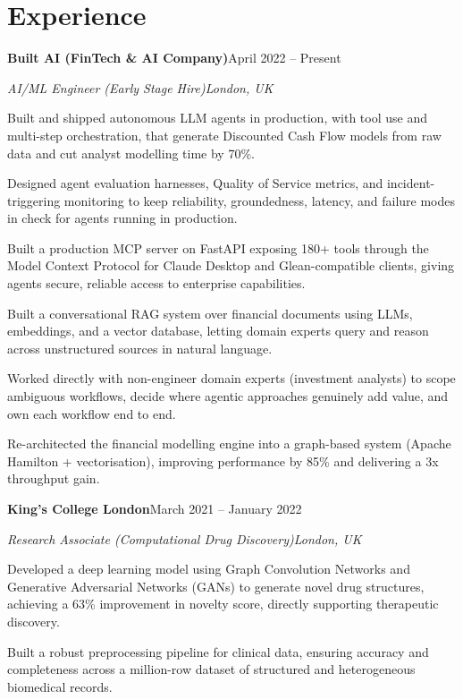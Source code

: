 \documentclass[10pt,a4paper]{article}
\newcommand{\entry}[4]{%
  {\color{company}\bfseries #1}\hfill {\color{muted}#2}\par
  \vspace{1pt}
  {\itshape #3}\hfill {\color{muted}\itshape #4}\par
  \vspace{3pt}%
}
\begin{document}
\section{Experience}
\entry{Built AI (FinTech \& AI Company)}{April 2022 -- Present}{AI/ML Engineer (Early Stage Hire)}{London, UK}
\begin{tight}
  \item Built and shipped autonomous LLM agents in production, with tool use and multi-step orchestration, that generate Discounted Cash Flow models from raw data and cut analyst modelling time by 70\%.
  \item Designed agent evaluation harnesses, Quality of Service metrics, and incident-triggering monitoring to keep reliability, groundedness, latency, and failure modes in check for agents running in production.
  \item Built a production MCP server on FastAPI exposing 180+ tools through the Model Context Protocol for Claude Desktop and Glean-compatible clients, giving agents secure, reliable access to enterprise capabilities.
  \item Built a conversational RAG system over financial documents using LLMs, embeddings, and a vector database, letting domain experts query and reason across unstructured sources in natural language.
  \item Worked directly with non-engineer domain experts (investment analysts) to scope ambiguous workflows, decide where agentic approaches genuinely add value, and own each workflow end to end.
  \item Re-architected the financial modelling engine into a graph-based system (Apache Hamilton + vectorisation), improving performance by 85\% and delivering a 3x throughput gain.
\end{tight}

\entry{King's College London}{March 2021 -- January 2022}{Research Associate (Computational Drug Discovery)}{London, UK}
\begin{tight}
  \item Developed a deep learning model using Graph Convolution Networks and Generative Adversarial Networks (GANs) to generate novel drug structures, achieving a 63\% improvement in novelty score, directly supporting therapeutic discovery.
  \item Built a robust preprocessing pipeline for clinical data, ensuring accuracy and completeness across a million-row dataset of structured and heterogeneous biomedical records.
\end{tight}
\end{document}
